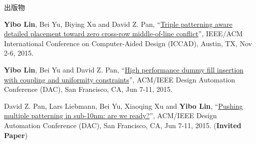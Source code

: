 \begin{rSection}{出版物}
\begin{description}[font=\normalfont]
{}
            

\item[{[C3]}]{
        \textbf{Yibo Lin}, Bei Yu, Biying Xu and David Z. Pan, 
    ``\href{http://dl.acm.org/citation.cfm?id=2840875}{Triple patterning aware detailed placement toward zero cross-row middle-of-line conflict}'', 
    IEEE/ACM International Conference on Computer-Aided Design (ICCAD), Austin, TX, Nov 2-6, 2015.
    
}
            

\item[{[C2]}]{
        \textbf{Yibo Lin}, Bei Yu and David Z. Pan, 
    ``\href{http://dl.acm.org/citation.cfm?id=2744769.2744850}{High performance dummy fill insertion with coupling and uniformity constraints}'', 
    ACM/IEEE Design Automation Conference (DAC), San Francisco, CA, Jun 7-11, 2015.
    
}
            

\item[{[C1]}]{
        David Z. Pan, Lars Liebmann, Bei Yu, Xiaoqing Xu and \textbf{Yibo Lin}, 
    ``\href{http://dl.acm.org/citation.cfm?id=2744769.2747940}{Pushing multiple patterning in sub-10nm: are we ready?}'', 
    ACM/IEEE Design Automation Conference (DAC), San Francisco, CA, Jun 7-11, 2015.
    (\textbf{Invited Paper})
}
            

\end{description}
    

\end{rSection}


